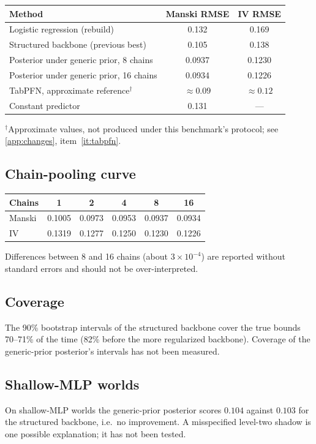 \documentclass[11pt]{article}
\theoremstyle{definition}
\theoremstyle{remark}
\begin{document}
\begin{center}
\begin{tabular}{@{}lcc@{}}
\toprule
Method & Manski RMSE & IV RMSE\\
\midrule
Logistic regression (rebuild) & 0.132 & 0.169\\
Structured backbone (previous best) & 0.105 & 0.138\\
Posterior under generic prior, 8 chains & 0.0937 & 0.1230\\
Posterior under generic prior, 16 chains & 0.0934 & 0.1226\\
TabPFN, approximate reference$^{\dagger}$ & $\approx0.09$ & $\approx0.12$\\
Constant predictor & 0.131 & ---\\
\bottomrule
\end{tabular}
\end{center}
{\small $^\dagger$Approximate values, not produced under this benchmark's protocol; see
\cref{app:changes}, item~\ref{it:tabpfn}.}

\subsection{Chain-pooling curve}
\begin{center}
\begin{tabular}{@{}lccccc@{}}
\toprule
Chains & 1 & 2 & 4 & 8 & 16\\
\midrule
Manski & 0.1005 & 0.0973 & 0.0953 & 0.0937 & 0.0934\\
IV & 0.1319 & 0.1277 & 0.1250 & 0.1230 & 0.1226\\
\bottomrule
\end{tabular}
\end{center}
Differences between 8 and 16 chains (about $3\times10^{-4}$) are reported without standard errors and
should not be over-interpreted.

\subsection{Coverage}
The 90\% bootstrap intervals of the structured backbone cover the true bounds 70--71\% of the time
(82\% before the more regularized backbone). Coverage of the generic-prior posterior's intervals has
not been measured.

\subsection{Shallow-MLP worlds}
On shallow-MLP worlds the generic-prior posterior scores $0.104$ against $0.103$ for the structured
backbone, i.e.\ no improvement. A misspecified level-two shadow is one possible explanation; it has not been
tested.
\end{document}
